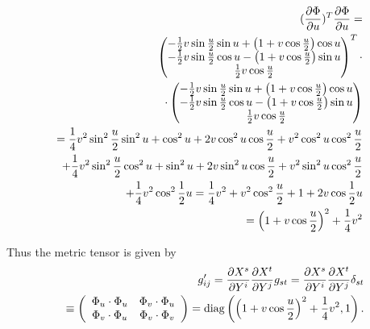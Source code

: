 {\begin{equation}
\begin{split}
(\frac{\partial \Phi }{\partial u})^{T}\frac{\partial \Phi }{\partial u}
=
\\
\begin{pmatrix}
-\frac{1}{2}v\sin \frac{u}{2}\sin u+\left( 1+v\cos \frac{u}{2}\right) \cos
u \\
-\frac{1}{2}v\sin \frac{u}{2}\cos u-\left( 1+v\cos \frac{u}{2}\right) \sin
u \\
\frac{1}{2}v\cos \frac{u}{2}
\end{pmatrix}^{T} \cdot
\\
\cdot
\begin{pmatrix}
-\frac{1}{2}v\sin \frac{u}{2}\sin u+\left( 1+v\cos \frac{u}{2}\right) \cos
u \\
-\frac{1}{2}v\sin \frac{u}{2}\cos u-\left( 1+v\cos \frac{u}{2}\right) \sin
u \\
\frac{1}{2}v\cos \frac{u}{2}
\end{pmatrix}
 \\
=
\frac{1}{4}v^{2}\sin ^{2}\frac{u}{2}\sin ^{2}u+\cos
^{2}u+2 v \cos ^{2}u \cos \frac{u}{2}+
v^{2}\cos ^{2}u  \cos ^{2}\frac{u}{2}
\\
+\frac{1}{4}v^{2}\sin ^{2}\frac{u}{2}\cos^{2}u
+\sin ^{2}u+2  v\sin ^{2}u\cos \frac{u}{2}+ v^{2} \sin^{2}u\cos ^{2}\frac{u}{2}
 \\
+\frac{1}{4}v^{2}\cos ^{2}\frac{1}{2}%
u =\allowbreak \frac{1}{4}v^{2}+v^{2}\cos ^{2}\frac{u}{2}+1+2v\cos \frac{%
1}{2}u
 \\
=\left(1+v\cos \frac{u}{2}\right)^{2}+\frac{1}{4}v^{2}
\end{split}
\end{equation}


Thus the metric tensor is given by
\begin{equation}
\begin{split}
g'_{ij}
= {\partial {X}^s\over \partial { Y }^i}{\partial {X}^t\over \partial { Y }^j}g_{st}
= {\partial {X}^s\over \partial { Y }^i}{\partial {X}^t\over \partial { Y }^j}\delta_{st}\\
\quad \equiv
\left(
\begin{array}{cc}
\Phi _{u}\cdot \Phi _{u} & \Phi _{v}\cdot \Phi _{u} \\
\Phi _{v}\cdot \Phi _{u} & \Phi _{v}\cdot \Phi _{v}
\end{array}
\right) ={\rm diag}\left(
\left(1+v\cos \frac{u}{2}\right)^{2}+\frac{1}{4}v^{2} , 1\right).
\end{split}
\end{equation}

\eexample
}







